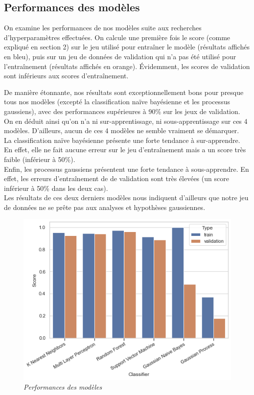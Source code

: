 \subsection{Performances des modèles}

On examine les performances de nos modèles suite aux recherches d'hyperparamètres effectuées. On calcule une première fois le score (comme expliqué en section 2) sur le jeu utilisé pour entraîner le modèle (résultats affichés en bleu), puis sur un jeu de données de validation qui n'a pas été utilisé pour l'entraînement (résultats affichés en orange). Évidemment, les scores de validation sont inférieurs aux scores d'entraînement.

De manière étonnante, nos résultats sont exceptionnellement bons pour presque tous nos modèles (excepté la classification naïve bayésienne et les processus gaussiens), avec des performances supérieures à 90\% sur les jeux de validation.\\

On en déduit ainsi qu'on n'a ni sur-apprentissage, ni sous-apprentissage sur ces 4 modèles. D'ailleurs, aucun de ces 4 modèles ne semble vraiment se démarquer.\\

La classification naïve bayésienne présente une forte tendance à sur-apprendre. En effet, elle ne fait aucune erreur sur le jeu d'entraînement mais a un score très faible (inférieur à 50\%).\\

Enfin, les processus gaussiens présentent une forte tendance à sous-apprendre. En effet, les erreurs d'entraînement de de validation sont très élevées (un score inférieur à 50\% dans les deux cas).\\

Les résultats de ces deux derniers modèles nous indiquent d'ailleurs que notre jeu de données ne se prête pas aux analyses et hypothèses gaussiennes.\\

\begin{figure}[h]
    \centering
    \includegraphics[scale=1]{Images/graphiques/results_barplot_V3.png}
    \caption{\it{Performances des modèles}}
    \label{fig:species_repartition}
\end{figure}